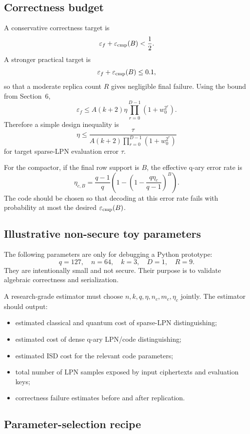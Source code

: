 \subsection{Correctness budget}

A conservative correctness target is
\[
    \varepsilon_f+\varepsilon_{\rm cmp}(B)<\frac12.
\]
A stronger practical target is
\[
    \varepsilon_f+\varepsilon_{\rm cmp}(B)\le 0.1,
\]
so that a moderate replica count $R$ gives negligible final failure.  Using the bound from Section~6,
\[
    \varepsilon_f
    \le
    A(k+2)\eta\prod_{r=0}^{D-1}(1+w_0^{2^r}).
\]
Therefore a simple design inequality is
\[
    \eta
    \le
    \frac{\tau}{A(k+2)\prod_{r=0}^{D-1}(1+w_0^{2^r})}
\]
for target sparse-LPN evaluation error $\tau$.

For the compactor, if the final row support is $B$, the effective q-ary error rate is
\[
    \eta_{c,B}=\frac{q-1}{q}\left(1-\left(1-\frac{q\eta_c}{q-1}\right)^B\right).
\]
The code should be chosen so that decoding at this error rate fails with probability at most the desired $\varepsilon_{\rm cmp}(B)$.

\subsection{Illustrative non-secure toy parameters}

The following parameters are only for debugging a Python prototype:
\[
    q=127,\quad n=64,\quad k=3,\quad D=1,\quad R=9.
\]
They are intentionally small and not secure.  Their purpose is to validate algebraic correctness and serialization.

A research-grade estimator must choose $n,k,q,\eta,n_c,m_c,\eta_c$ jointly.  The estimator should output:
\begin{itemize}
    \item estimated classical and quantum cost of sparse-LPN distinguishing;
    \item estimated cost of dense q-ary LPN/code distinguishing;
    \item estimated ISD cost for the relevant code parameters;
    \item total number of LPN samples exposed by input ciphertexts and evaluation keys;
    \item correctness failure estimates before and after replication.
\end{itemize}

\subsection{Parameter-selection recipe}


